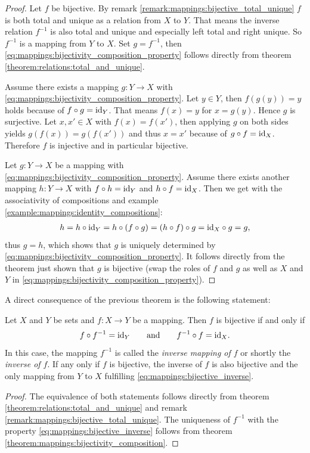 \begin{proof}
    \proofright Let $f$ be bijective. By remark \ref{remark:mappings:bijective_total_unique} $f$ is both total and unique as a relation from $X$ to $Y$. That means the inverse relation $f^{-1}$ is also total and unique and especially left total and right unique. So $f^{-1}$ is a mapping from $Y$ to $X$. Set $g=f^{-1}$, then \eqref{eq:mappings:bijectivity_composition_property} follows directly from theorem \ref{theorem:relations:total_and_unique}.

    \proofleft Assume there exists a mapping $g\colon Y\rightarrow X$ with \eqref{eq:mappings:bijectivity_composition_property}.  Let $y\in Y$, then $f(g(y))=y$ holds because of $f\circ g=\text{id}_Y$. That means $f(x)=y$ for $x=g(y)$. Hence $g$ is surjective.  Let $x,x'\in X$ with $f(x)=f(x')$, then applying $g$ on both sides yields $g(f(x))=g(f(x'))$ and thus $x=x'$ because of $g\circ f=\text{id}_X$. Therefore $f$ is injective and in particular bijective.

     Let $g\colon Y\rightarrow X$ be a mapping with \eqref{eq:mappings:bijectivity_composition_property}. Assume there exists another mapping $h\colon Y\rightarrow X$ with $f\circ h=\text{id}_Y$ and $h\circ f=\text{id}_X$. Then we get with the associativity of compositions and example \ref{example:mappings:identity_compositions}:
    \begin{align}h=h\circ\text{id}_Y=h\circ (f\circ g)=(h\circ f)\circ g=\text{id}_X\circ g=g,\end{align}
    thus $g=h$, which shows that $g$ is uniquely determined by \eqref{eq:mappings:bijectivity_composition_property}. It follows directly from the theorem just shown that $g$ is bijective (swap the roles of $f$ and $g$ as well as $X$ and $Y$ in \ref{eq:mappings:bijectivity_composition_property}).
\end{proof}

A direct consequence of the previous theorem is the following statement:

\begin{theorem}\label{theorem:mappings:bijective_inverse}
    Let $X$ and $Y$ be sets and $f\colon X\rightarrow Y$ be a mapping. Then $f$ is bijective if and only if
    \begin{align}f\circ f^{-1}=\text{id}_Y\qquad\text{and}\qquad f^{-1}\circ f=\text{id}_X.\label{eq:mappings:bijective_inverse}\end{align}
    In this case, the mapping $f^{-1}$ is called the \emph{inverse mapping of $f$} or shortly the \emph{inverse of $f$}. If any only if $f$ is bijective, the inverse of $f$ is also bijective and the only mapping from $Y$ to $X$ fulfilling \eqref{eq:mappings:bijective_inverse}.
\end{theorem}
\begin{proof}
    The equivalence of both statements follows directly from theorem \ref{theorem:relations:total_and_unique} and remark \ref{remark:mappings:bijective_total_unique}. The uniqueness of $f^{-1}$ with the property \eqref{eq:mappings:bijective_inverse} follows from theorem \ref{theorem:mappings:bijectivity_composition}.
\end{proof}

